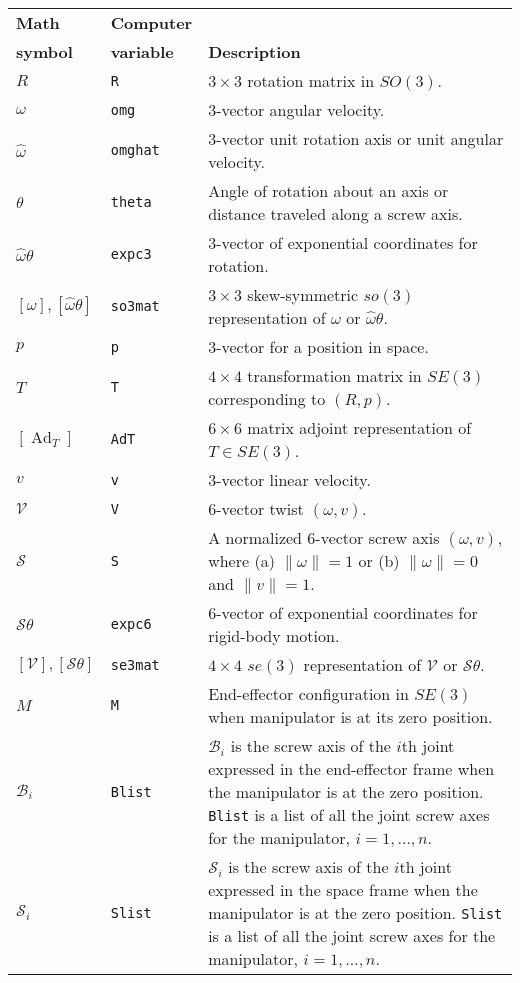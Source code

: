 \documentclass[11pt]{article}
\begin{document}
\begin{tabularx}{\linewidth}{llp{4.5in}}
\toprule
{\bf Math} & {\bf Computer} & \\
{\bf symbol} & {\bf variable} & {\bf Description} \\
\midrule
$R$ & {\tt R} & $3 \times 3$ rotation matrix in $SO(3)$. \\
$\omega$ & {\tt omg} & $3$-vector angular velocity. \\
$\hat{\omega}$ & {\tt omghat} & $3$-vector unit rotation axis or unit angular velocity. \\
$\theta$ & {\tt theta} & Angle of rotation about an axis or distance traveled along a screw axis. \\
$\hat{\omega} \theta$ & {\tt expc3} & $3$-vector of exponential coordinates for rotation. \\
$[\omega], [\hat{\omega} \theta] $ & {\tt so3mat} & $3 \times 3$ skew-symmetric $so(3)$ representation of $\omega$ or $\hat{\omega} \theta$. \\
$p$ & {\tt p} & $3$-vector for a position in space. \\
$T$ & {\tt T} & $4 \times 4$ transformation matrix in $SE(3)$ corresponding to $(R,p)$. \\
$[\operatorname{Ad}_T]$ & {\tt AdT} & $6 \times 6$ matrix adjoint representation of $T \in SE(3)$. \\
$v$ & {\tt v} & $3$-vector linear velocity. \\
$\mathcal{V}$ & {\tt V} & $6$-vector twist $(\omega, v)$. \\
$\mathcal{S}$ & {\tt S} & A normalized $6$-vector screw axis $(\omega,v)$, where (a) $\|\omega\| = 1$ or (b) $\|\omega\| = 0$ and $\|v\| = 1$. \\
$\mathcal{S}\theta$ & {\tt expc6} & $6$-vector of exponential coordinates for rigid-body motion. \\
$[\mathcal{V}], [\mathcal{S} \theta]$ & {\tt se3mat} & $4 \times 4$ $se(3)$ representation of $\mathcal{V}$ or $\mathcal{S} \theta$. \\
$M$ & {\tt M} & End-effector configuration in $SE(3)$ when manipulator is at its zero position. \\
$\mathcal{B}_i$ & {\tt Blist} & $\mathcal{B}_i$ is the screw axis of the $i$th joint expressed in the end-effector frame when the manipulator is at the zero position.  {\tt Blist} is a list of all the joint screw axes for the manipulator, $i = 1, \ldots, n$. \\
$\mathcal{S}_i$ & {\tt Slist} & $\mathcal{S}_i$ is the screw axis of the $i$th joint expressed in the space frame when the manipulator is at the zero position.  {\tt Slist} is a list of all the joint screw axes for the manipulator,  $i = 1, \ldots, n$. \\

\end{tabularx}
\end{document}
